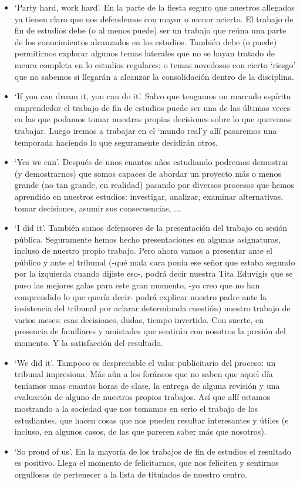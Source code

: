 \begin{itemize}
\item `Party hard, work hard'. En la parte de la fiesta seguro que nuestros allegados ya tienen claro que nos defendemos con mayor o menor acierto. El trabajo de fin de estudios debe (o al menos puede) ser un trabajo que reúna una parte de los conocimientos alcanzados en los estudios. También debe (o puede) permitirnos explorar algunos temas laterales que no se hayan tratado de menra completa en lo estudios regulares; o temas novedosos con cierto `riesgo' que no sabemos si llegarán a alcanzar la consolidación dentro de la disciplina.
\item `If you can dream it, you can do it'. Salvo que tengamos un marcado espíritu emprendedor el trabajo de fin de estudios puede ser una de las últimas veces en las que podamos tomar nuestras propias decisiones sobre lo que queremos trabajar. Luego iremos a trabajar en el `mundo real'\textregistered y allí pasaremos una temporada haciendo lo que seguramente decidirán otros.
\item `Yes we can'. Después de unos cuantos años estudiando podremos demostrar (y demostrarnos) que somos capaces de abordar un proyecto más o menos grande (no tan grande, en realidad) pasando por diversos procesos que hemos aprendido en nuestros estudios: investigar, analizar, examinar alternativas, tomar decisiones, asumir sus consecuencias, ...
\item `I did it'. También somos defensores de la presentación del trabajo en sesión pública. Seguramente hemos hecho presentaciones en algunas asignaturas, incluso de nuestro propio trabajo. Pero ahora vamos a presentar ante el público y ante el tribunal (-qué mala cara ponía ese señor que estaba segundo por la izquierda cuando dijiste eso-, podrá decir nuestra Tita Eduvigis que se puso las mejores galas para este gran momento, -yo creo que no han comprendido lo que quería decir- podrá explicar nuestro padre ante la insistencia del tribunal por aclarar determinada cuestión) nuestro trabajo de varios meses: esas decisiones, dudas, tiempo invertido. Con suerte, en presencia de familiares y amistades que sentirán con nosotros la presión del momento. Y la satisfacción del resultado.
\item `We did it'. Tampoco es despreciable el valor publicitario del proceso: un tribunal impresiona. Más aún a los foráneos que no saben que aquel día teníamos unas cuantas horas de clase, la entrega de alguna revisión y una evaluación de alguno de nuestros propios trabajos. Así que allí estamos mostrando a la sociedad que nos tomamos en serio el trabajo de los estudiantes, que hacen cosas que nos pueden resultar interesantes y útiles (e incluso, en algunos casos, de las que parecen saber más que nosotros).
\item `So proud of us'. En la mayoría de los trabajos de fin de estudios el resultado es positivo. Llega el momento de felicitarnos, que nos feliciten y sentirnos orgullosos de pertenecer a la lista de titulados de nuestro centro.
\end{itemize}
